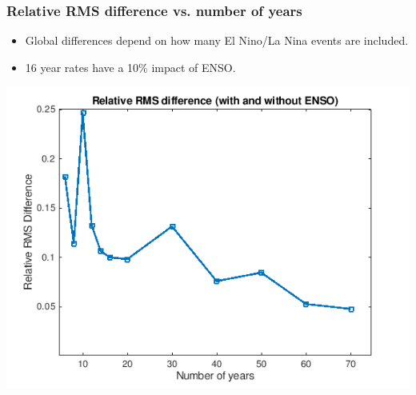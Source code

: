 \documentclass[10pt,t]{beamer}
\begin{document}
 \begin{frame}
  \frametitle{Relative RMS difference vs. number of years}
 \begin{itemize}
 \item Global differences depend on how many El Nino/La Nina events are included. 
 \item 16 year rates have a 10\% impact of ENSO.  
 \end{itemize}
\centering 
\includegraphics[width=0.7\linewidth]{./figures/RMS_rel_diff.png}
 \end{frame}
\end{document}

